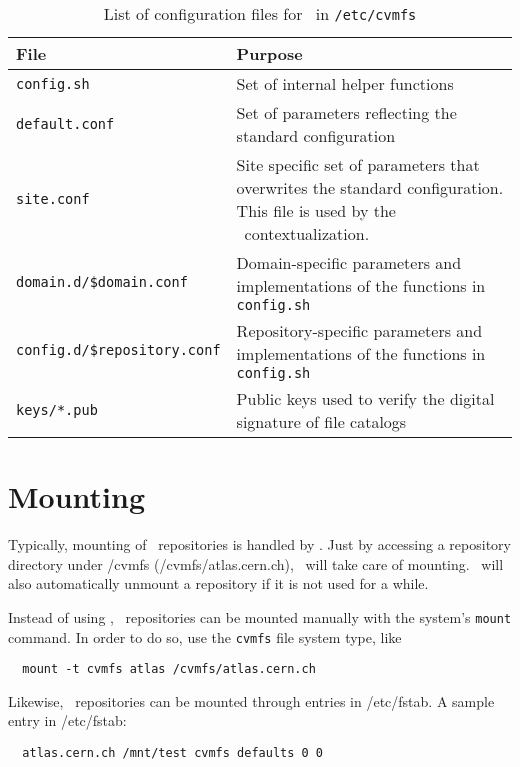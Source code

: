 \begin{table}
	\begin{center}
		\begin{tabularx}{\linewidth}{lX}
			\toprule
			{\bf\centering File} & {\bf\centering Purpose} \\
			\midrule
			\texttt{config.sh} & Set of internal helper functions \\
			\texttt{default.conf} & Set of parameters reflecting the standard configuration \\
			\texttt{site.conf} & Site specific set of parameters that overwrites the standard configuration.  
				This file is used by the \cernvm\ contextualization. \\
			\texttt{domain.d/\$domain.conf} & Domain-specific parameters and implementations of the functions in \texttt{config.sh} \\
			\texttt{config.d/\$repository.conf} & Repository-specific parameters and implementations of the functions in \texttt{config.sh} \\
			\texttt{keys/*.pub} & Public keys used to verify the digital signature of file catalogs \\
			\bottomrule
		\end{tabularx}
	\end{center}
	\caption{List of configuration files for \cvmfs\ in \texttt{/etc/cvmfs}}
	\label{tbl:configfiles}
\end{table}


\section{Mounting}
Typically, mounting of \cvmfs\ repositories is handled by \autofs.
Just by accessing a repository directory under /cvmfs (\eg /cvmfs/atlas.cern.ch), \autofs\ will take care of mounting.
\autofs\ will also automatically unmount a repository if it is not used for a while.

Instead of using \autofs, \cvmfs\ repositories can be mounted manually with the system's \texttt{mount} command.
In order to do so, use the \texttt{cvmfs} file system type, like
\begin{verbatim}
  mount -t cvmfs atlas /cvmfs/atlas.cern.ch
\end{verbatim}
Likewise, \cvmfs\ repositories can be mounted through entries in /etc/fstab.
A sample entry in /etc/fstab:
\begin{verbatim}
  atlas.cern.ch /mnt/test cvmfs defaults 0 0
\end{verbatim}

